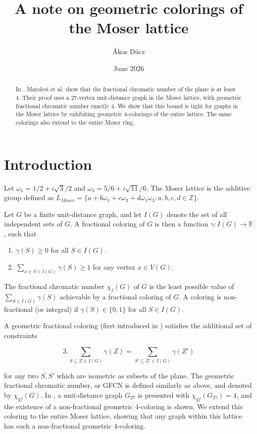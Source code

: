 \documentclass{article}
\title{A note on geometric colorings of the Moser lattice}
\author[1]{Ákos Dúcz}
\affil[1]{HUN-REN Alfréd Rényi Institute of Mathematics, Budapest, Hungary}
\date{June 2026}
\begin{document}
\maketitle

\begin{abstract}
    In \cite{matolcsi2025fractionalchromaticnumberplane}, Matolcsi et al. show that the fractional chromatic number of the plane is at least 4. Their proof uses a 27-vertex unit-distance graph in the Moser lattice, with geometric fractional chromatic number exactly 4. We show that this bound is tight for graphs in the Moser lattice by exhibiting geometric 4-colorings of the entire lattice. The same colorings also extend to the entire Moser ring.
\end{abstract}
\section{Introduction}
Let $\omega_1 = 1/2 + i\sqrt{3}/2$ and $\omega_3 = 5/6 + i\sqrt{11}/6$.
The Moser lattice is the additive group defined as $L_{Moser} = \{a + b\omega_1 + c\omega_3 + d\omega_1\omega_3 : a,b,c,d\in\mathbb{Z}\}$.

Let $G$ be a finite unit-distance graph, and let $I(G)$ denote the set of all independent sets of $G$. A fractional coloring of $G$ is then a function $\gamma: I(G) \rightarrow \mathbb{R}$, such that

\begin{enumerate}
    \item $\gamma(S) \geq 0$ for all $S \in I(G)$.
    \item $\sum_{x \in S \in I(G)} \gamma(S) \geq 1$ for any vertex $x\in V(G)$.
\end{enumerate}
The fractional chromatic number $\chi_f(G)$ of $G$ is the least possible value of $\sum_{S\in I(G)}\gamma(S)$ achievable by a fractional coloring of $G$. A coloring is non-fractional (or integral) if $\gamma(S) \in \{0,1\}$ for all $S \in I(G)$.

A geometric fractional coloring (first introduced in \cite{density}) satisfies the additional set of constraints

\[3. \sum_{S \subseteq Z \in I(G)} \gamma(Z) = \sum_{S' \subseteq Z' \in I(G)} \gamma(Z') \]

for any two $S, S'$ which are isometric as subsets of the plane. The geometric fractional chromatic number, or GFCN is defined similarly as above, and denoted by $\chi_{gf}(G)$.
In \cite{matolcsi2025fractionalchromaticnumberplane}, a unit-distance graph $G_{27}$ is presented with $\chi_{gf}(G_{27}) = 4$, and the existence of a non-fractional geometric 4-coloring is shown. We extend this coloring to the entire Moser lattice, showing that any graph within this lattice has such a non-fractional geometric 4-coloring.
\end{document}
